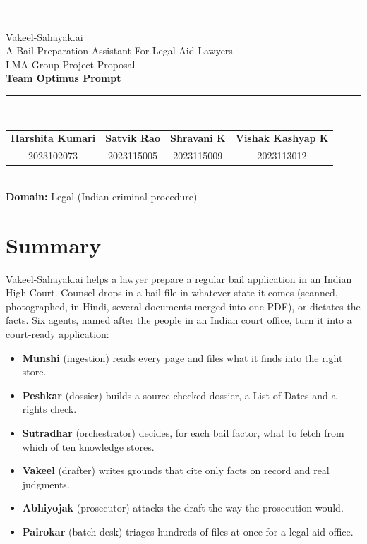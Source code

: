 \documentclass[10pt,a4paper]{article}
\begin{document}
\begin{center}
{\color{accent}\rule{\linewidth}{1.2pt}}\\[4pt]
{\fontsize{32}{36}\selectfont\color{accent} Vakeel-Sahayak.ai}\\[3pt]
{\Large A Bail-Preparation Assistant For Legal-Aid Lawyers}\\[4pt]
{\large LMA Group Project Proposal}\\[3pt]
{\large\textbf{Team Optimus Prompt}}\\[2pt]
{\color{accent}\rule{\linewidth}{0.5pt}}\\[4pt]
\begin{tabular*}{\linewidth}{@{\extracolsep{\fill}}cccc@{}}
\textbf{Harshita Kumari} & \textbf{Satvik Rao} & \textbf{Shravani K} & \textbf{Vishak Kashyap K} \\[1pt]
{\small 2023102073} & {\small 2023115005} & {\small 2023115009} & {\small 2023113012} \\
\end{tabular*}\\[3pt]
{\small \textbf{Domain:} Legal (Indian criminal procedure)}
\end{center}
\vspace{-2pt}

\section{Summary}

Vakeel-Sahayak.ai helps a lawyer prepare a regular bail application in an Indian High Court. Counsel drops in a bail file in whatever state it comes (scanned, photographed, in Hindi, several documents merged into one PDF), or dictates the facts. Six agents, named after the people in an Indian court office, turn it into a court-ready application:

\begin{itemize}
\item \textbf{Munshi} (ingestion) reads every page and files what it finds into the right store.
\item \textbf{Peshkar} (dossier) builds a source-checked dossier, a List of Dates and a rights check.
\item \textbf{Sutradhar} (orchestrator) decides, for each bail factor, what to fetch from which of ten knowledge stores.
\item \textbf{Vakeel} (drafter) writes grounds that cite only facts on record and real judgments.
\item \textbf{Abhiyojak} (prosecutor) attacks the draft the way the prosecution would.
\item \textbf{Pairokar} (batch desk) triages hundreds of files at once for a legal-aid office.
\end{itemize}
\end{document}
